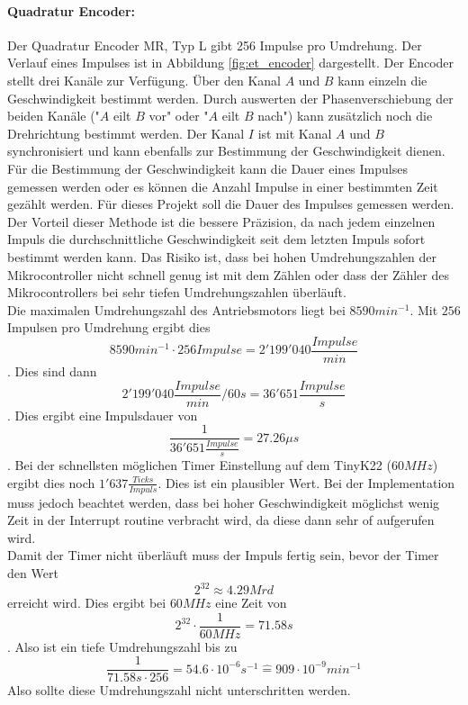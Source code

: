 \documentclass[../../main.tex]{subfiles}
\begin{document}
    \paragraph{Quadratur Encoder:} Der Quadratur Encoder MR, Typ L gibt 256 Impulse pro Umdrehung. Der Verlauf eines Impulses ist in Abbildung \ref{fig:et_encoder} dargestellt. Der Encoder stellt drei Kanäle zur Verfügung. Über den Kanal $A$ und $B$ kann einzeln die Geschwindigkeit bestimmt werden. Durch auswerten der Phasenverschiebung der beiden Kanäle ("$A$ eilt $B$ vor" oder "$A$ eilt $B$ nach") kann zusätzlich noch die Drehrichtung bestimmt werden. Der Kanal $I$ ist mit Kanal $A$ und $B$ synchronisiert und kann ebenfalls zur Bestimmung der Geschwindigkeit dienen.\\
    Für die Bestimmung der Geschwindigkeit kann die Dauer eines Impulses gemessen werden oder es können die Anzahl Impulse in einer bestimmten Zeit gezählt werden. Für dieses Projekt soll die Dauer des Impulses gemessen werden. Der Vorteil dieser Methode ist die bessere Präzision, da nach jedem einzelnen Impuls die durchschnittliche Geschwindigkeit seit dem letzten Impuls sofort bestimmt werden kann. Das Risiko ist, dass bei hohen Umdrehungszahlen der Mikrocontroller nicht schnell genug ist mit dem Zählen oder dass der Zähler des Mikrocontrollers bei sehr tiefen Umdrehungszahlen überläuft.\\
    Die maximalen Umdrehungszahl des Antriebsmotors liegt bei $8590 min^{-1}$. Mit $256$ Impulsen pro Umdrehung ergibt dies $$8590 min^{-1} \cdot 256 Impulse = 2'199'040 \frac{Impulse}{min}$$.
    Dies sind dann $$ 2'199'040 \frac{Impulse}{min} / 60s = 36'651 \frac{Impulse}{s} $$.
    Dies ergibt eine Impulsdauer von $$\frac{1}{36'651 \frac{Impulse}{s}} = 27.26\mu s$$. Bei der schnellsten möglichen Timer Einstellung auf dem TinyK22 ($60MHz$) ergibt dies noch $1'637 \frac{Ticks}{Impuls}$. Dies ist ein plausibler Wert. Bei der Implementation muss jedoch beachtet werden, dass bei hoher Geschwindigkeit möglichst wenig Zeit in der Interrupt routine verbracht wird, da diese dann sehr of aufgerufen wird.\\
    Damit der Timer nicht überläuft muss der Impuls fertig sein, bevor der Timer den Wert $$2^{32} \approx 4.29 Mrd$$ erreicht wird. Dies ergibt bei $60MHz$ eine Zeit von $$2^{32} \cdot \frac{1}{60MHz} = 71.58s$$. Also ist ein tiefe Umdrehungszahl bis zu $$\frac{1}{71.58s \cdot 256} = 54.6 \cdot 10^{-6} s^{-1} \hat{=} 909 \cdot 10^{-9} min^{-1}$$
    Also sollte diese Umdrehungszahl nicht unterschritten werden. 
    
\end{document}
